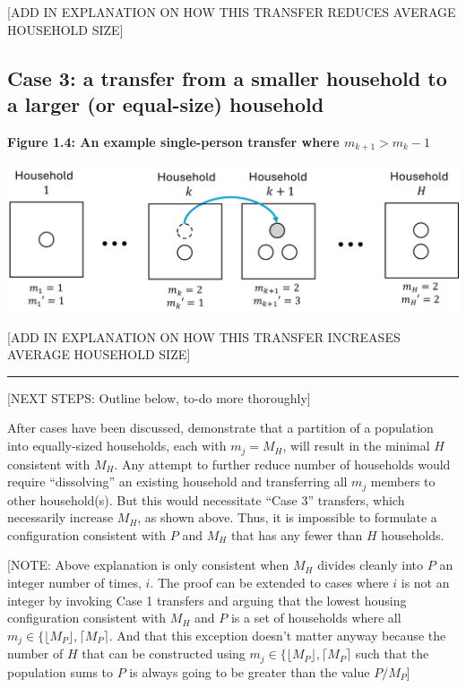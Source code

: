 \documentclass[
]{article}
\begin{document}
{[}ADD IN EXPLANATION ON HOW THIS TRANSFER REDUCES AVERAGE HOUSEHOLD
SIZE{]}

\hypertarget{case-3-a-transfer-from-a-smaller-household-to-a-larger-or-equal-size-household}{%
\subsection{Case 3: a transfer from a smaller household to a larger (or
equal-size)
household}\label{case-3-a-transfer-from-a-smaller-household-to-a-larger-or-equal-size-household}}

\textbf{Figure 1.4: An example single-person transfer where
\(m_{k+1} > m_k - 1\)}

\includegraphics[width=1\linewidth]{proof_files/figure1-5}

{[}ADD IN EXPLANATION ON HOW THIS TRANSFER INCREASES AVERAGE HOUSEHOLD
SIZE{]}

\begin{center}\rule{0.5\linewidth}{0.5pt}\end{center}

{[}NEXT STEPS: Outline below, to-do more thoroughly{]}

After cases have been discussed, demonstrate that a partition of a
population into equally-sized households, each with \(m_j = M_H\), will
result in the minimal \(H\) consistent with \(M_H\). Any attempt to
further reduce number of households would require ``dissolving'' an
existing household and transferring all \(m_j\) members to other
household(s). But this would necessitate ``Case 3'' transfers, which
necessarily increase \(M_H\), as shown above. Thus, it is impossible to
formulate a configuration consistent with \(P\) and \(M_H\) that has any
fewer than \(H\) households.

{[}NOTE: Above explanation is only consistent when \(M_H\) divides
cleanly into \(P\) an integer number of times, \(i\). The proof can be
extended to cases where \(i\) is not an integer by invoking Case 1
transfers and arguing that the lowest housing configuration consistent
with \(M_H\) and \(P\) is a set of households where all
\(m_j \in \{ \lfloor M_P \rfloor, \lceil M_P \rceil\). And that this
exception doesn't matter anyway because the number of \(H\) that can be
constructed using \(m_j \in \{ \lfloor M_P \rfloor, \lceil M_P \rceil\)
such that the population sums to \(P\) is always going to be greater
than the value \(P / M_P\){]}
\end{document}
